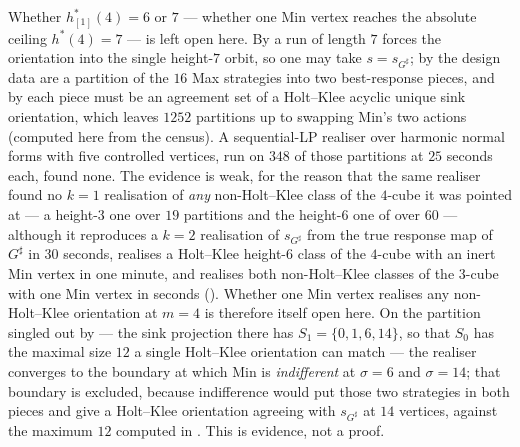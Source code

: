 \begin{remark}[What the Min budget costs at $m=4$: a search, not a theorem]\label{mb:m4-search}
Whether $h^{\ast}_{[1]}(4)=6$ or $7$ --- whether one Min vertex reaches the
absolute ceiling $h^{\ast}(4)=7$ --- is left open here. By
 a run of length $7$ forces the orientation into the
single height-$7$ orbit, so one may take $s=s_{G^{\sharp}}$; by
 the design data are a partition of the $16$ Max strategies
into two best-response pieces, and by  each piece must
be an agreement set of a Holt--Klee acyclic unique sink orientation, which
leaves $1252$ partitions up to swapping Min's two actions (computed here
from the census). A sequential-LP realiser over harmonic normal forms with
five controlled vertices, run on $348$ of those partitions at
$25$ seconds each, found none. The evidence is weak, for the reason that
the same realiser found no $k=1$ realisation of \emph{any} non-Holt--Klee
class of the $4$-cube it was pointed at --- a height-$3$ one over $19$
partitions and the height-$6$ one of  over $60$ --- although
it reproduces a $k=2$ realisation of $s_{G^{\sharp}}$ from the true
response map of $G^{\sharp}$ in $30$ seconds, realises a Holt--Klee
height-$6$ class of the $4$-cube with an inert Min vertex in one minute,
and realises both non-Holt--Klee classes of the $3$-cube with one Min
vertex in seconds (). Whether one Min vertex realises
any non-Holt--Klee orientation at $m=4$ is therefore itself open here. On the
partition singled out by  --- the sink projection there
has $S_1=\{0,1,6,14\}$, so that $S_0$ has the maximal size $12$ a single
Holt--Klee orientation can match --- the realiser converges to the boundary
at which Min is \emph{indifferent} at $\sigma=6$ and $\sigma=14$; that
boundary is excluded, because indifference would put those two strategies
in both pieces and give a Holt--Klee orientation agreeing with
$s_{G^{\sharp}}$ at $14$ vertices, against the maximum $12$ computed in
. This is evidence, not a proof.
\end{remark}

